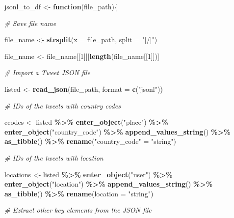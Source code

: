 \documentclass[
]{book}
\newenvironment{Shaded}{\begin{snugshade}}{\end{snugshade}}
\newcommand{\AttributeTok}[1]{\textcolor[rgb]{0.13,0.29,0.53}{#1}}
\newcommand{\CommentTok}[1]{\textcolor[rgb]{0.56,0.35,0.01}{\textit{#1}}}
\newcommand{\ControlFlowTok}[1]{\textcolor[rgb]{0.13,0.29,0.53}{\textbf{#1}}}
\newcommand{\DecValTok}[1]{\textcolor[rgb]{0.00,0.00,0.81}{#1}}
\newcommand{\FunctionTok}[1]{\textcolor[rgb]{0.13,0.29,0.53}{\textbf{#1}}}
\newcommand{\NormalTok}[1]{#1}
\newcommand{\OtherTok}[1]{\textcolor[rgb]{0.56,0.35,0.01}{#1}}
\newcommand{\SpecialCharTok}[1]{\textcolor[rgb]{0.81,0.36,0.00}{\textbf{#1}}}
\newcommand{\StringTok}[1]{\textcolor[rgb]{0.31,0.60,0.02}{#1}}
\begin{document}
\begin{Shaded}
\begin{Highlighting}[]
\NormalTok{jsonl\_to\_df }\OtherTok{\textless{}{-}} \ControlFlowTok{function}\NormalTok{(file\_path)\{}

\CommentTok{\# Save file name }

\NormalTok{file\_name }\OtherTok{\textless{}{-}} \FunctionTok{strsplit}\NormalTok{(}\AttributeTok{x =}\NormalTok{ file\_path, }
                     \AttributeTok{split =} \StringTok{"[/]"}\NormalTok{) }

\NormalTok{file\_name }\OtherTok{\textless{}{-}}\NormalTok{ file\_name[[}\DecValTok{1}\NormalTok{]][}\FunctionTok{length}\NormalTok{(file\_name[[}\DecValTok{1}\NormalTok{]])]}

\CommentTok{\# Import a Tweet JSON file}

\NormalTok{listed }\OtherTok{\textless{}{-}} \FunctionTok{read\_json}\NormalTok{(file\_path, }\AttributeTok{format =} \FunctionTok{c}\NormalTok{(}\StringTok{"jsonl"}\NormalTok{))}

\CommentTok{\# IDs of the tweets with country codes}

\NormalTok{ccodes }\OtherTok{\textless{}{-}}\NormalTok{ listed }\SpecialCharTok{\%\textgreater{}\%}
  \FunctionTok{enter\_object}\NormalTok{(}\StringTok{"place"}\NormalTok{) }\SpecialCharTok{\%\textgreater{}\%}
  \FunctionTok{enter\_object}\NormalTok{(}\StringTok{"country\_code"}\NormalTok{) }\SpecialCharTok{\%\textgreater{}\%}
  \FunctionTok{append\_values\_string}\NormalTok{() }\SpecialCharTok{\%\textgreater{}\%}
  \FunctionTok{as\_tibble}\NormalTok{() }\SpecialCharTok{\%\textgreater{}\%}
  \FunctionTok{rename}\NormalTok{(}\StringTok{"country\_code"} \OtherTok{=} \StringTok{"string"}\NormalTok{)}

\CommentTok{\# IDs of the tweets with location}

\NormalTok{locations }\OtherTok{\textless{}{-}}\NormalTok{ listed }\SpecialCharTok{\%\textgreater{}\%}
  \FunctionTok{enter\_object}\NormalTok{(}\StringTok{"user"}\NormalTok{) }\SpecialCharTok{\%\textgreater{}\%}
  \FunctionTok{enter\_object}\NormalTok{(}\StringTok{"location"}\NormalTok{) }\SpecialCharTok{\%\textgreater{}\%}
  \FunctionTok{append\_values\_string}\NormalTok{() }\SpecialCharTok{\%\textgreater{}\%}
  \FunctionTok{as\_tibble}\NormalTok{() }\SpecialCharTok{\%\textgreater{}\%}
  \FunctionTok{rename}\NormalTok{(}\AttributeTok{location =} \StringTok{"string"}\NormalTok{)}

\CommentTok{\# Extract other key elements from the JSON file}


\end{Highlighting}
\end{Shaded}
\end{document}
